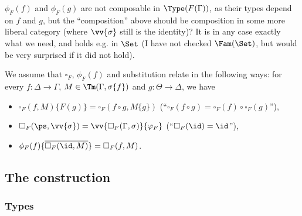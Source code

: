 \documentclass{article}
\newcommand{\isoFL}{\ensuremath{\phi_{F}}} %
\begin{document}
\begin{remark}
  $\isoFL(f)$ and $\isoFL(g)$ are not composable in
  $\Type(F(\Gamma))$, as their types depend on $f$ and $g$, but the
  ``composition'' above should be composition in some more liberal
  category (where $\vv{\sigma}$ still is the identity)? It is in any
  case exactly what we need, and holds e.g. in $\Set$ (I
  have not checked $\Fam(\Set)$, but would be very surprised if it did
  not hold).
\end{remark}

We assume that $\square_F$, $\isoFL(f)$ and substitution relate in the
following ways: for every $f : \Delta \to \Gamma$, $M \in \Tm(\Gamma,
\sigma\{f\})$ and $g : \Theta \to \Delta$, we have
\begin{itemize}
\item $\square_F(f, M)\{F(g)\} = \square_F(f \circ g, M\{g\})$  \quad(``$\square_F(f \circ g) = \square_F(f) \circ \square_F(g)$''),
\item $\square_F(\ps, \vv{\sigma}) = \vv{\square_F(\Gamma, \sigma)}\{\varphi_F\}$ \quad\qquad\qquad(``$\square_F(\id) = \id$''),
\item $\isoFL(f)\{\overline{\square_F(\id, M)}\} = \square_F(f, M)$.
\end{itemize}

\subsection{The construction}

\subsubsection{Types}
\end{document}
